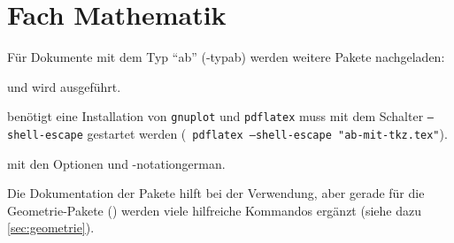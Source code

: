 \section{Fach Mathematik}\label{sec:fachmathe}

Für Dokumente mit dem Typ \enquote{ab} (\keyis*-{typ}{ab}) werden weitere Pakete nachgeladen:
\begin{multicols}{2}
	\begin{smallitemize}
		\item {}
		\item {}
		\item {}
		\item {}
		\item {}
		\item {}
		\item {} und  wird ausgeführt.
		\item {} benötigt eine Installation von \texttt{gnuplot} und \texttt{pdflatex} muss mit dem Schalter \texttt{--shell-escape} gestartet werden (\zB\  \texttt{pdflatex --shell-escape "ab-mit-tkz.tex"}).
		\item {} mit den Optionen  und \keyis*-{notation}{german}.
		\item {}
		\item {}
	\end{smallitemize}
\end{multicols}

Die Dokumentation der Pakete hilft bei der Verwendung, aber gerade für die Geometrie-Pakete () werden viele hilfreiche Kommandos ergänzt (siehe dazu \ref{sec:geometrie}).

